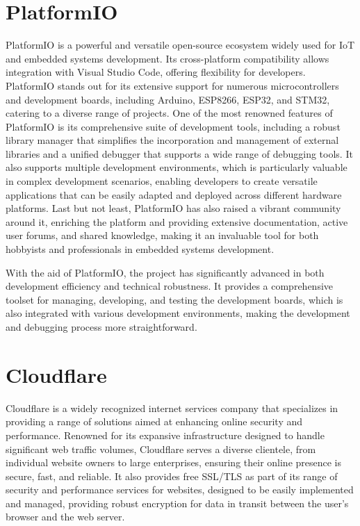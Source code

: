 \documentclass[../Main.tex]{subfiles}
\begin{document}
\section{PlatformIO}
PlatformIO is a powerful and versatile open-source ecosystem widely used for IoT and embedded systems development. Its cross-platform compatibility allows integration with Visual Studio Code, offering flexibility for developers. PlatformIO stands out for its extensive support for numerous microcontrollers and development boards, including Arduino, ESP8266, ESP32, and STM32, catering to a diverse range of projects\cite{platformio}. One of the most renowned features of PlatformIO is its comprehensive suite of development tools, including a robust library manager that simplifies the incorporation and management of external libraries and a unified debugger that supports a wide range of debugging tools. It also supports multiple development environments, which is particularly valuable in complex development scenarios, enabling developers to create versatile applications that can be easily adapted and deployed across different hardware platforms. Last but not least, PlatformIO has also raised a vibrant community around it, enriching the platform and providing extensive documentation, active user forums, and shared knowledge, making it an invaluable tool for both hobbyists and professionals in embedded systems development.

With the aid of PlatformIO, the project has significantly advanced in both development efficiency and technical robustness. It provides a comprehensive toolset for managing, developing, and testing the development boards, which is also integrated with various development environments, making the development and debugging process more straightforward.

\section{Cloudflare}
Cloudflare is a widely recognized internet services company that specializes in providing a range of solutions aimed at enhancing online security and performance. Renowned for its expansive infrastructure designed to handle significant web traffic volumes, Cloudflare serves a diverse clientele, from individual website owners to large enterprises, ensuring their online presence is secure, fast, and reliable. It also provides free SSL/TLS as part of its range of security and performance services for websites, designed to be easily implemented and managed, providing robust encryption for data in transit between the user's browser and the web server\cite{cloudflare}. 
\end{document}
